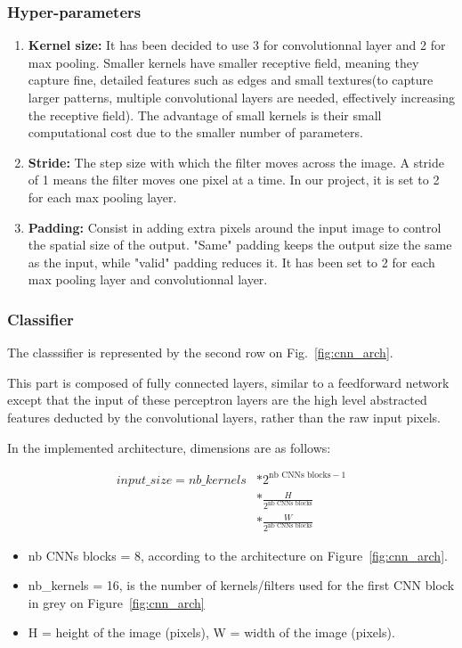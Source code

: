 \documentclass[twocolumn,superscriptaddress,aps]{revtex4-1}
\begin{document}
\subsubsection{Hyper-parameters}
\begin{enumerate}
    \item 
    \textbf{Kernel size:} It has been decided to use 3 for convolutionnal layer and 2 for max pooling. Smaller kernels have smaller receptive field, meaning they capture fine, detailed features such as edges and small textures(to capture larger patterns, multiple convolutional layers are needed, effectively increasing the receptive field). The advantage of small kernels is their small computational cost due to the smaller number of parameters.
    \item 
    \textbf{Stride:} The step size with which the filter moves across the image. A stride of 1 means the filter moves one pixel at a time. In our project, it is set to 2 for each max pooling layer.
    \item 
    \textbf{Padding:} Consist in adding extra pixels around the input image to control the spatial size of the output. "Same" padding keeps the output size the same as the input, while "valid" padding reduces it. It has been set to 2 for each max pooling layer and convolutionnal layer.
\end{enumerate}

\subsubsection{Classifier}

The classsifier is represented by the second row on Fig.~\ref{fig:cnn_arch}.

This part is composed of fully connected layers, similar to a feedforward network except that the input of these perceptron layers are the high level abstracted features deducted by the convolutional layers, rather than the raw input pixels.

In the implemented architecture, dimensions are as follows:

\begin{align*}  
input\_size  = nb\_kernels & * 2^{\text{nb CNNs blocks} - 1} \\ & * \frac{H}{2^\text{nb CNNs blocks}} \\ & * \frac{W}{2^\text{nb CNNs blocks}}
\end{align*}

\begin{itemize}
    \item 
    nb CNNs blocks = 8, according to the architecture on Figure~\ref{fig:cnn_arch}.
    \item 
    nb\_kernels = 16, is the number of kernels/filters used for the first CNN block in grey on Figure~\ref{fig:cnn_arch}
    \item 
    H = height of the image (pixels), W = width of the image (pixels).
\end{itemize}
\end{document}
